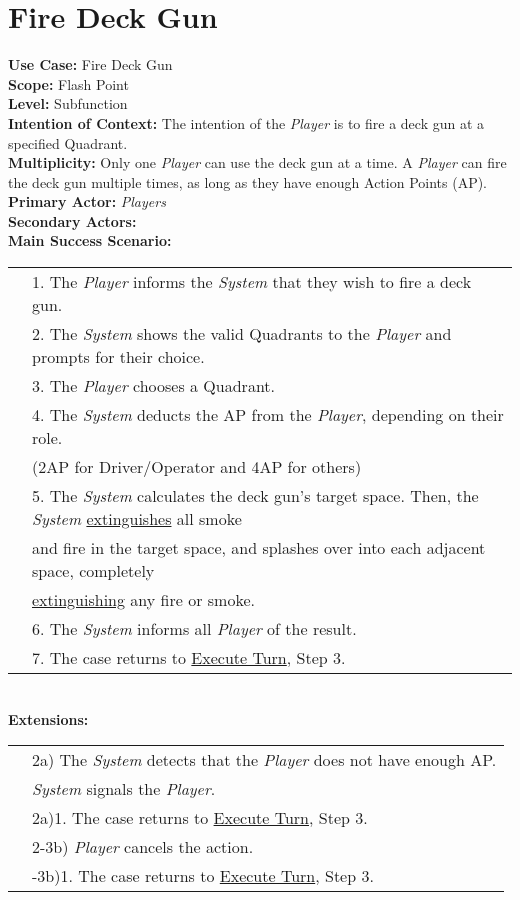 \documentclass{article}
\begin{document}
	\section*{Fire Deck Gun}
	\textbf{Use Case:} Fire Deck Gun\\
	\textbf{Scope:} Flash Point\\
	\textbf{Level:} Subfunction\\
	\textbf{Intention of Context:} The intention of the \textit{Player} is to fire a deck gun at a specified Quadrant.\\
	\textbf{Multiplicity: }Only one \textit{Player} can use the deck gun at a time. A \textit{Player} can fire the deck gun multiple times, as long as they have enough Action Points (AP).\\
	\textbf{Primary Actor:} \textit{Players}\\
	\textbf{Secondary Actors:}\\
	\textbf{Main Success Scenario:}\\
	\begin{tabular}{l l}
		&1. The \textit{Player} informs the \textit{System} that they wish to fire a deck gun.\\
		&2. The \textit{System} shows the valid Quadrants to the \textit{Player} and prompts for their choice.\\
		&3. The \textit{Player} chooses a Quadrant.\\
		&4. The \textit{System} deducts the AP from the \textit{Player}, depending on their role.\\
		&\qquad (2AP for Driver/Operator and 4AP for others)\\
		&5. The \textit{System} calculates the deck gun’s target space. Then, the \textit{System} \underline{extinguishes} all smoke\\
		&\qquad and fire in the target space, and splashes over into each adjacent space, completely\\ &\qquad\underline{extinguishing} any fire or smoke.\\
		&6. The \textit{System} informs all \textit{Player} of the result.\\
		&7. The case returns to \underline{Execute Turn}, Step 3.
	\end{tabular}\\
	\textbf{Extensions:}\\
	\begin{tabular}{l l}
		&2a) The \textit{System} detects that the \textit{Player} does not have enough AP.\\ &\qquad\textit{System} signals the \textit{Player}.\\
		&\qquad2a)1. The case returns to \underline{Execute Turn}, Step 3.\\
		&2-3b) \textit{Player} cancels the action.\\
		&\qquad2-3b)1. The case returns to \underline{Execute Turn}, Step 3.
	\end{tabular}\\
	
\end{document}

